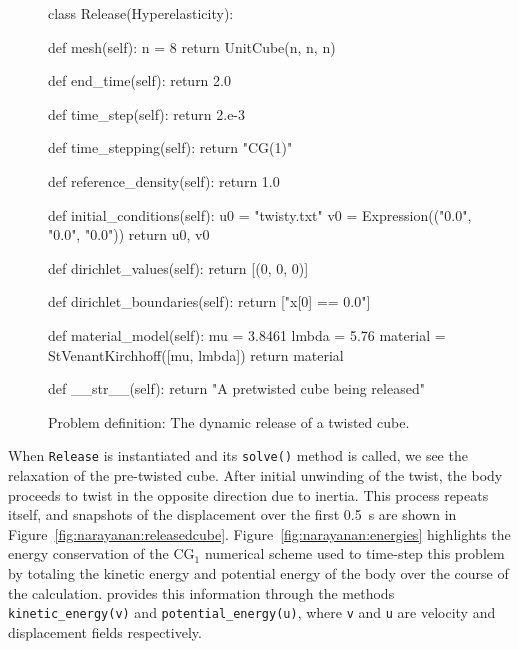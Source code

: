 \begin{figure}[ht]
\begin{python}
class Release(Hyperelasticity):

    def mesh(self):
        n = 8
        return UnitCube(n, n, n)

    def end_time(self):
        return 2.0

    def time_step(self):
        return 2.e-3

    def time_stepping(self):
        return "CG(1)"

    def reference_density(self):
        return 1.0

    def initial_conditions(self):
        u0 = "twisty.txt"
        v0 = Expression(("0.0", "0.0", "0.0"))
        return u0, v0

    def dirichlet_values(self):
        return [(0, 0, 0)]

    def dirichlet_boundaries(self):
        return ["x[0] == 0.0"]

    def material_model(self):
        mu    = 3.8461
        lmbda = 5.76
        material = StVenantKirchhoff([mu, lmbda])
        return material

    def __str__(self):
        return "A pretwisted cube being released"
\end{python}
\caption{Problem definition: The dynamic release of a twisted cube.}
\label{code:narayanan:dynamicrelease}
\end{figure}

When {\tt Release} is instantiated and its {\tt solve()} method is
called, we see the relaxation of the pre-twisted cube. After initial
unwinding of the twist, the body proceeds to twist in the opposite
direction due to inertia. This process repeats itself, and snapshots
of the displacement over the first 0.5~s are shown in
Figure~\ref{fig:narayanan:releasedcube}. Figure~\ref{fig:narayanan:energies}
highlights the energy conservation of the CG$_{1}$ numerical scheme used
to time-step this problem by totaling the kinetic energy and
potential energy of the body over the course of the
calculation. \twist{} provides this information through the methods
{\tt kinetic\_energy(v)} and {\tt potential\_energy(u)}, where {\tt v}
and {\tt u} are velocity and displacement fields respectively.

